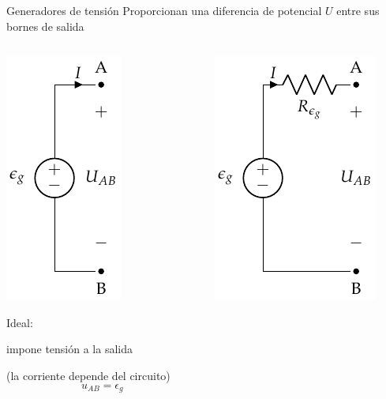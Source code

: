 \documentclass[aspectratio=169, xcolor={usenames,svgnames,dvipsnames}]{beamer}
\begin{document}
\begin{frame}{Generadores de tensión}
    Proporcionan una diferencia de potencial $U$ entre sus bornes de salida
    \vspace{-5mm}
    \begin{columns}[T]
    \begin{column}{0.4\columnwidth}
        \begin{center}
         \hspace*{-10mm}\includegraphics[height=0.5\textheight]{../figs/FuenteTensionIdealDC.pdf}  

        \vspace{2mm}  
        \alert{Ideal}: 
        
        impone tensión a la salida   
        
        \small{(la corriente depende del circuito)}
        \begin{equation*}
            u_{AB}=\epsilon_g
        \end{equation*}
        \end{center}
    \end{column}
    \begin{column}{0.38\columnwidth}
        \begin{center}
        \hspace*{-10mm}\includegraphics[height=0.5\textheight]{../figs/FuenteTensionRealDC.pdf}


\end{center}
\end{column}
\end{columns}
\end{frame}
\end{document}
